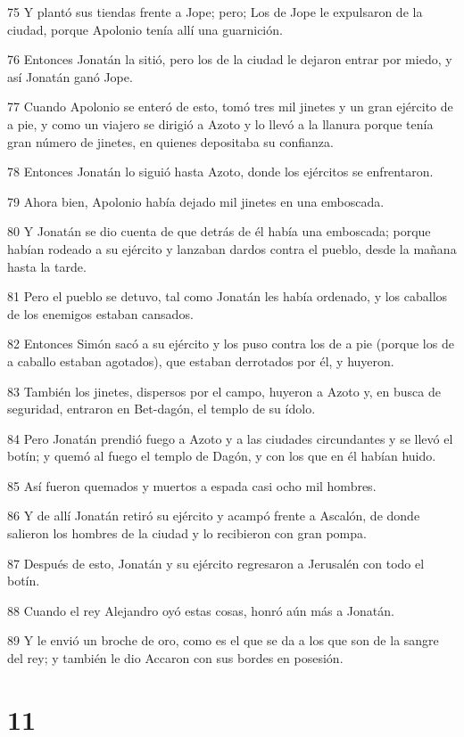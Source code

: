 \par 75 Y plantó sus tiendas frente a Jope; pero; Los de Jope le expulsaron de la ciudad, porque Apolonio tenía allí una guarnición.
\par 76 Entonces Jonatán la sitió, pero los de la ciudad le dejaron entrar por miedo, y así Jonatán ganó Jope.
\par 77 Cuando Apolonio se enteró de esto, tomó tres mil jinetes y un gran ejército de a pie, y como un viajero se dirigió a Azoto y lo llevó a la llanura porque tenía gran número de jinetes, en quienes depositaba su confianza.
\par 78 Entonces Jonatán lo siguió hasta Azoto, donde los ejércitos se enfrentaron.
\par 79 Ahora bien, Apolonio había dejado mil jinetes en una emboscada.
\par 80 Y Jonatán se dio cuenta de que detrás de él había una emboscada; porque habían rodeado a su ejército y lanzaban dardos contra el pueblo, desde la mañana hasta la tarde.
\par 81 Pero el pueblo se detuvo, tal como Jonatán les había ordenado, y los caballos de los enemigos estaban cansados.
\par 82 Entonces Simón sacó a su ejército y los puso contra los de a pie (porque los de a caballo estaban agotados), que estaban derrotados por él, y huyeron.
\par 83 También los jinetes, dispersos por el campo, huyeron a Azoto y, en busca de seguridad, entraron en Bet-dagón, el templo de su ídolo.
\par 84 Pero Jonatán prendió fuego a Azoto y a las ciudades circundantes y se llevó el botín; y quemó al fuego el templo de Dagón, y con los que en él habían huido.
\par 85 Así fueron quemados y muertos a espada casi ocho mil hombres.
\par 86 Y de allí Jonatán retiró su ejército y acampó frente a Ascalón, de donde salieron los hombres de la ciudad y lo recibieron con gran pompa.
\par 87 Después de esto, Jonatán y su ejército regresaron a Jerusalén con todo el botín.
\par 88 Cuando el rey Alejandro oyó estas cosas, honró aún más a Jonatán.
\par 89 Y le envió un broche de oro, como es el que se da a los que son de la sangre del rey; y también le dio Accaron con sus bordes en posesión.

\chapter{11}

